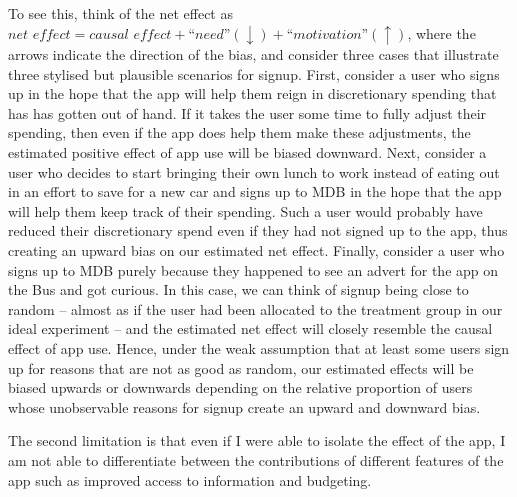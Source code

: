To see this, think of the net effect as $\textit{net effect} = \textit{causal
effect} + \textit{``need''}(\downarrow) + \textit{``motivation''}(\uparrow)$,
where the arrows indicate the direction of the bias, and consider three cases
that illustrate three stylised but plausible scenarios for signup. First,
consider a user who signs up in the hope that the app will help them reign in
discretionary spending that has has gotten out of hand. If it takes the user
some time to fully adjust their spending, then even if the app does help them
make these adjustments, the estimated positive effect of app use will be biased
downward. Next, consider a user who decides to start bringing their own lunch
to work instead of eating out in an effort to save for a new car and signs up
to MDB in the hope that the app will help them keep track of their spending.
Such a user would probably have reduced their discretionary spend even if they
had not signed up to the app, thus creating an upward bias on our estimated net
effect. Finally, consider a user who signs up to MDB purely because they
happened to see an advert for the app on the Bus and got curious. In this case,
we can think of signup being close to random -- almost as if the user had been
allocated to the treatment group in our ideal experiment -- and the estimated
net effect will closely resemble the causal effect of app use. Hence, under the
weak assumption that at least some users sign up for reasons that are not as
good as random, our estimated effects will be biased upwards or downwards
depending on the relative proportion of users whose unobservable reasons for
signup create an upward and downward bias.

The second limitation is that even if I were able to isolate the effect of
the app, I am not able to differentiate between the contributions of different
features of the app such as improved access to information and budgeting.


